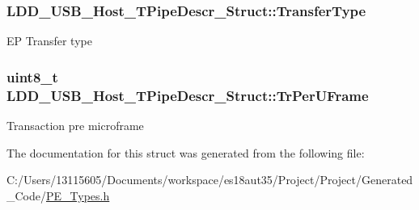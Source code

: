 \subsubsection[{Transfer\+Type}]{ L\+D\+D\+\_\+\+U\+S\+B\+\_\+\+Host\+\_\+\+T\+Pipe\+Descr\+\_\+\+Struct\+::\+Transfer\+Type}\label{struct_l_d_d___u_s_b___host___t_pipe_descr___struct_a42bf0ec64bda6f7f31d32e3f4cd5df13}
E\+P Transfer type \hypertarget{struct_l_d_d___u_s_b___host___t_pipe_descr___struct_adb11454d0380a421cf7ab4fc225e5c41}{}
\subsubsection[{Tr\+Per\+U\+Frame}]{\setlength{\rightskip}{0pt plus 5cm}uint8\+\_\+t L\+D\+D\+\_\+\+U\+S\+B\+\_\+\+Host\+\_\+\+T\+Pipe\+Descr\+\_\+\+Struct\+::\+Tr\+Per\+U\+Frame}\label{struct_l_d_d___u_s_b___host___t_pipe_descr___struct_adb11454d0380a421cf7ab4fc225e5c41}
Transaction pre microframe 

The documentation for this struct was generated from the following file\+:\begin{DoxyCompactItemize}
\item 
C\+:/\+Users/13115605/\+Documents/workspace/es18aut35/\+Project/\+Project/\+Generated\+\_\+\+Code/\hyperlink{_p_e___types_8h}{P\+E\+\_\+\+Types.\+h}\end{DoxyCompactItemize}
